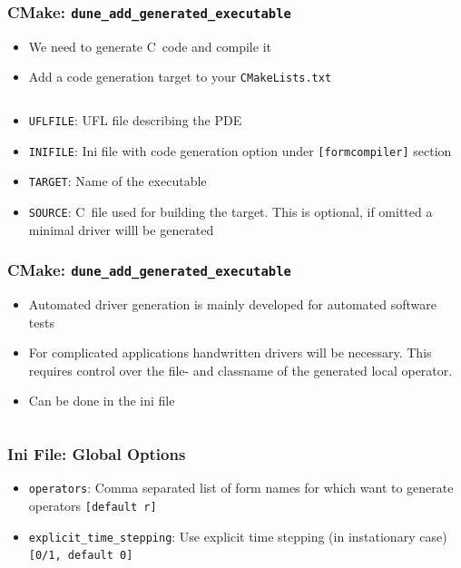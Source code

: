 \documentclass[ignorenonframetext,11pt]{beamer}
\theoremstyle{definition}
\def\CC{{C\nolinebreak[4]\hspace{-.05em}\raisebox{.4ex}{\tiny\bf ++}}}
\begin{document}
\begin{frame}[fragile]
  \frametitle{CMake: \lstinline{dune_add_generated_executable}}

  \begin{itemize}
  \item We need to generate \CC\ code and compile it
  \item Add a code generation target to your \lstinline{CMakeLists.txt}
    \inputminted[fontsize=\scriptsize]{cmake}{generated_executable.txt}
  \item \lstinline{UFLFILE}: UFL file describing the PDE
  \item \lstinline{INIFILE}: Ini file with code generation option under \lstinline{[formcompiler]} section
  \item \lstinline{TARGET}: Name of the executable
  \item \lstinline{SOURCE}: \CC\ file used for building the target. This is
    optional, if omitted a minimal driver willl be generated
  \end{itemize}
\end{frame}

\begin{frame}[fragile]
  \frametitle{CMake: \lstinline{dune_add_generated_executable}}

  \begin{itemize}
  \item Automated driver generation is mainly developed for automated software
    tests
  \item For complicated applications handwritten drivers will be
    necessary. This requires control over the file- and classname of the
    generated local operator.
  \item Can be done in the ini file \vspace{0.3cm}
    \inputminted[fontsize=\scriptsize]{ini}{classname_filename.ini}
  \end{itemize}
\end{frame}

\begin{frame}[fragile]
  \frametitle{Ini File: Global Options}

  \begin{itemize}
  \item \lstinline{operators}: Comma separated list of form names for which
    want to generate operators \lstinline{[default r]}
  \item \lstinline{explicit_time_stepping}: Use explicit time stepping (in
    instationary case) \lstinline{[0/1, default 0]}
  \end{itemize}
\end{frame}
\end{document}
